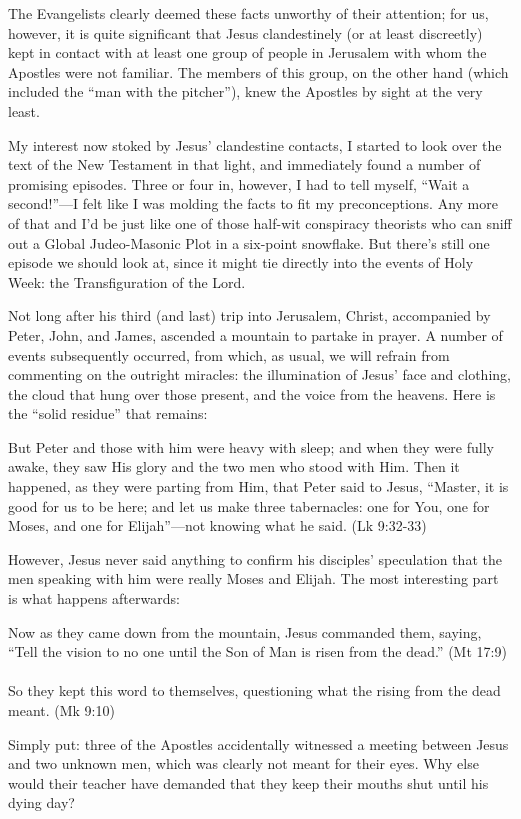 The Evangelists clearly deemed these facts unworthy of their attention; for us, however, it is quite significant that Jesus clandestinely (or at least discreetly) kept in contact with at least one group of people in Jerusalem with whom the Apostles were not familiar. The members of this group, on the other hand (which included the ``man with the pitcher''), knew the Apostles by sight at the very least.

My interest now stoked by Jesus' clandestine contacts, I started to look over the text of the New Testament in that light, and immediately found a number of promising episodes. Three or four in, however, I had to tell myself, ``Wait a second!''---I felt like I was molding the facts to fit my preconceptions. Any more of that and I'd be just like one of those half-wit conspiracy theorists who can sniff out a Global Judeo-Masonic Plot in a six-point snowflake. But there's still one episode we should look at, since it might tie directly into the events of Holy Week: the Transfiguration of the Lord.

Not long after his third (and last) trip into Jerusalem, Christ, accompanied by Peter, John, and James, ascended a mountain to partake in prayer. A number of events subsequently occurred, from which, as usual, we will refrain from commenting on the outright miracles: the illumination of Jesus' face and clothing, the cloud that hung over those present, and the voice from the heavens. Here is the ``solid residue'' that remains:

\begin{smallquote}
    But Peter and those with him were heavy with sleep; and when they were fully awake, they saw His glory and the two men who stood with Him. Then it happened, as they were parting from Him, that Peter said to Jesus, ``Master, it is good for us to be here; and let us make three tabernacles: one for You, one for Moses, and one for Elijah''---not knowing what he said. (Lk 9:32-33)
\end{smallquote}
However, Jesus never said anything to confirm his disciples' speculation that the men speaking with him were really Moses and Elijah. The most interesting part is what happens afterwards:

\begin{smallquote}
    Now as they came down from the mountain, Jesus commanded them, saying, ``Tell the vision to no one until the Son of Man is risen from the dead.'' (Mt 17:9) \\
    \\
    So they kept this word to themselves, questioning what the rising from the dead meant. (Mk 9:10)
\end{smallquote}
Simply put: three of the Apostles accidentally witnessed a meeting between Jesus and two unknown men, which was clearly not meant for their eyes. Why else would their teacher have demanded that they keep their mouths shut until his dying day?


